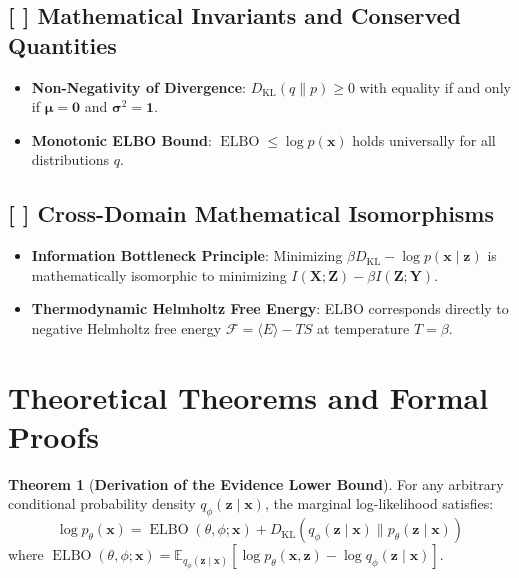\documentclass[11pt,a4paper]{article}
\theoremstyle{definition}
\newtheorem{theorem}{\textbf{Theorem}}[section]
\begin{document}
\subsection{[ ] Mathematical Invariants and Conserved Quantities}
\begin{itemize}
    \item \textbf{Non-Negativity of Divergence}: $D_{\text{KL}}(q \parallel p) \ge 0$ with equality if and only if $\boldsymbol{\mu} = \mathbf{0}$ and $\boldsymbol{\sigma}^2 = \mathbf{1}$.
    \item \textbf{Monotonic ELBO Bound}: $\operatorname{ELBO} \le \log p(\mathbf{x})$ holds universally for all distributions $q$.
\end{itemize}

\subsection{[ ] Cross-Domain Mathematical Isomorphisms}
\begin{itemize}
    \item \textbf{Information Bottleneck Principle}: Minimizing $\beta D_{\text{KL}} - \log p(\mathbf{x} \mid \mathbf{z})$ is mathematically isomorphic to minimizing $I(\mathbf{X}; \mathbf{Z}) - \beta I(\mathbf{Z}; \mathbf{Y})$.
    \item \textbf{Thermodynamic Helmholtz Free Energy}: ELBO corresponds directly to negative Helmholtz free energy $\mathcal{F} = \langle E \rangle - T S$ at temperature $T = \beta$.
\end{itemize}

\section{Theoretical Theorems and Formal Proofs}

\begin{theorem}[\textbf{Derivation of the Evidence Lower Bound}]
For any arbitrary conditional probability density $q_\phi(\mathbf{z} \mid \mathbf{x})$, the marginal log-likelihood satisfies:
{\boldmath
\begin{equation}
\log p_\theta(\mathbf{x}) = \operatorname{ELBO}(\theta, \phi; \mathbf{x}) + D_{\text{KL}}(q_\phi(\mathbf{z} \mid \mathbf{x}) \parallel p_\theta(\mathbf{z} \mid \mathbf{x}))
\end{equation}
}
where $\operatorname{ELBO}(\theta, \phi; \mathbf{x}) = \mathbb{E}_{q_\phi(\mathbf{z} \mid \mathbf{x})}[\log p_\theta(\mathbf{x}, \mathbf{z}) - \log q_\phi(\mathbf{z} \mid \mathbf{x})]$.
\end{theorem}
\end{document}
